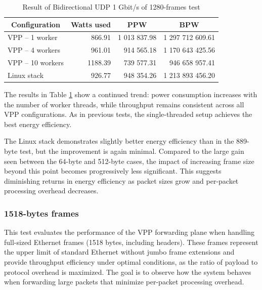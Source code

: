 \begin{table}[h!]
\centering
\begin{tabular}{|l|r|r|r|}
\hline
\multicolumn{1}{|c|}{\textbf{Configuration}} &
\multicolumn{1}{c|}{\textbf{Watts used}} &
\multicolumn{1}{c|}{\textbf{PPW}} &
\multicolumn{1}{c|}{\textbf{BPW}} \\
\hline
VPP -- 1 worker & 866.91 & 1 013 837.98 & 1 297 712 609.61 \\
VPP -- 4 workers & 961.01 & 914 565.18 & 1 170 643 425.56 \\
VPP -- 10 workers & 1188.39 & 739 577.31 & 946 658 957.41 \\
Linux stack & 926.77 & 948 354.26 & 1 213 893 456.20 \\
\hline
\end{tabular}
\caption{Result of Bidirectional UDP 1 Gbit/s of 1280-frames test}
\label{tab:udp:four}
\end{table}

The results in Table \ref{tab:udp:four} show a continued trend: power consumption increases with the number of worker threads, while throughput remains consistent across all VPP configurations. 
As in previous tests, the single-threaded setup achieves the best energy efficiency.

The Linux stack demonstrates slightly better energy efficiency than in the 889-byte test, but the improvement is again minimal. 
Compared to the large gain seen between the 64-byte and 512-byte cases, the impact of increasing frame size beyond this point becomes progressively less significant. 
This suggests diminishing returns in energy efficiency as packet sizes grow and per-packet processing overhead decreases.

\subsubsection{1518-bytes frames}
This test evaluates the performance of the VPP forwarding plane when handling full-sized Ethernet frames (1518 bytes, including headers). 
These frames represent the upper limit of standard Ethernet without jumbo frame extensions and provide throughput efficiency under optimal conditions, 
as the ratio of payload to protocol overhead is maximized. The goal is to observe how the system behaves when forwarding large packets that minimize per-packet processing overhead.

